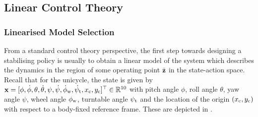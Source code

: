 \subsection{Linear Control Theory}
\subsubsection{Linearised Model Selection}

From a standard control theory perspective, the first step towards designing a stabilising policy is usually to obtain a linear model of the system which describes the dynamics in the region of some operating point $\bar{\mathbf{z}}$ in the state-action space. Recall that for the unicycle, the state is given by $\mathbf{x} = [\phi, \dot\phi, \theta, \dot\theta, \psi, \dot\psi, \dot\phi_{\text{w}}, \dot\psi_\text{t},x_\text{c}, y_\text{c}]^\top \in \mathbb{R}^{10}$ with pitch angle $\phi$, roll angle $\theta$, yaw angle $\psi$, wheel angle $\phi_{\text{w}}$, turntable angle $\psi_{\text{t}}$ and the location of the origin $(x_{\text{c}},y_{\text{c}})$ with respect to a body-fixed reference frame. These are depicted in . 

